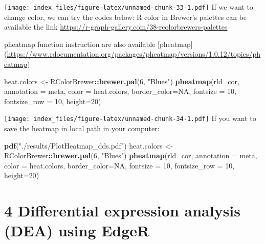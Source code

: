 \documentclass[
]{article}
\newenvironment{Shaded}{\begin{snugshade}}{\end{snugshade}}
\newcommand{\AttributeTok}[1]{\textcolor[rgb]{0.13,0.29,0.53}{#1}}
\newcommand{\ConstantTok}[1]{\textcolor[rgb]{0.56,0.35,0.01}{#1}}
\newcommand{\DecValTok}[1]{\textcolor[rgb]{0.00,0.00,0.81}{#1}}
\newcommand{\FunctionTok}[1]{\textcolor[rgb]{0.13,0.29,0.53}{\textbf{#1}}}
\newcommand{\NormalTok}[1]{#1}
\newcommand{\OtherTok}[1]{\textcolor[rgb]{0.56,0.35,0.01}{#1}}
\newcommand{\SpecialCharTok}[1]{\textcolor[rgb]{0.81,0.36,0.00}{\textbf{#1}}}
\newcommand{\StringTok}[1]{\textcolor[rgb]{0.31,0.60,0.02}{#1}}
\begin{document}
\texttt{[image: index\_files/figure-latex/unnamed-chunk-33-1.pdf]} If we
want to change color, we can try the codes below: R color in Brewer's
palettes can be available the link
\url{https://r-graph-gallery.com/38-rcolorbrewers-palettes}

pheatmap function instruction are also available {[}pheatmap{]}
(\url{https://www.rdocumentation.org/packages/pheatmap/versions/1.0.12/topics/pheatmap})

\begin{Shaded}
\begin{Highlighting}[]
\NormalTok{heat.colors }\OtherTok{\textless{}{-}}\NormalTok{ RColorBrewer}\SpecialCharTok{::}\FunctionTok{brewer.pal}\NormalTok{(}\DecValTok{6}\NormalTok{, }\StringTok{"Blues"}\NormalTok{)}
\FunctionTok{pheatmap}\NormalTok{(rld\_cor, }\AttributeTok{annotation =}\NormalTok{ meta, }\AttributeTok{color =}\NormalTok{ heat.colors, }\AttributeTok{border\_color=}\ConstantTok{NA}\NormalTok{, }\AttributeTok{fontsize =} \DecValTok{10}\NormalTok{, }
        \AttributeTok{fontsize\_row =} \DecValTok{10}\NormalTok{, }\AttributeTok{height=}\DecValTok{20}\NormalTok{)}
\end{Highlighting}
\end{Shaded}

\texttt{[image: index\_files/figure-latex/unnamed-chunk-34-1.pdf]} If you
want to save the heatmap in local path in your computer:

\begin{Shaded}
\begin{Highlighting}[]
\FunctionTok{pdf}\NormalTok{(}\StringTok{"./results/PlotHeatmap\_dds.pdf"}\NormalTok{)}
\NormalTok{heat.colors }\OtherTok{\textless{}{-}}\NormalTok{ RColorBrewer}\SpecialCharTok{::}\FunctionTok{brewer.pal}\NormalTok{(}\DecValTok{6}\NormalTok{, }\StringTok{"Blues"}\NormalTok{)}
\FunctionTok{pheatmap}\NormalTok{(rld\_cor, }\AttributeTok{annotation =}\NormalTok{ meta, }\AttributeTok{color =}\NormalTok{ heat.colors, }\AttributeTok{border\_color=}\ConstantTok{NA}\NormalTok{, }\AttributeTok{fontsize =} \DecValTok{10}\NormalTok{, }
        \AttributeTok{fontsize\_row =} \DecValTok{10}\NormalTok{, }\AttributeTok{height=}\DecValTok{20}\NormalTok{)}
\end{Highlighting}
\end{Shaded}

\section{4 Differential expression analysis (DEA) using
EdgeR}\label{differential-expression-analysis-dea-using-edger}
\end{document}
